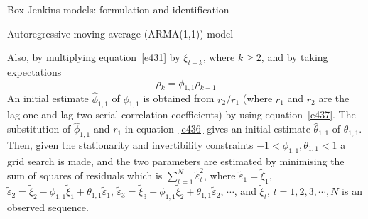 \documentclass[8pt]{beamer}
\renewcommand{\emph}[1]{\textcolor{myorange}{#1}}
\begin{document}
\begin{frame}{Box-Jenkins models: formulation and identification}
    \begin{block}{Autoregressive moving-average (ARMA(1,1)) model}
    \end{block}
    Also, by multiplying equation~\ref{e431} by $\xi_{t-k}$, where $k\geq 2$, and by taking expectations
    \begin{equation}
        \rho_{k} = \phi_{1,1} \rho_{k-1}
        \label{e437}
    \end{equation}
    An initial estimate $\hat{\phi}_{1,1}$ of $\phi_{1,1}$ is obtained from $r_2 / r_1$ (where $r_1$ and $r_2$ are the lag-one and lag-two serial correlation coefficients) by using equation~\ref{e437}. The substitution of $\hat{\phi}_{1,1}$ and $r_1$ in equation~\ref{e436} gives an initial estimate $\hat{\theta}_{1,1}$ of $\theta_{1,1}$. Then, given the \emph{stationarity} and \emph{invertibility} constraints $-1<\phi_{1,1}, \theta_{1,1}<1$ a \emph{grid search} is made, and the two parameters are estimated by minimising the sum of squares of residuals which is $\sum_{t=1}^N \tilde{\varepsilon}_t^2$, where $\tilde{\varepsilon}_1=\tilde{\xi}_1$, $\tilde{\varepsilon}_2=\tilde{\xi}_2 - \phi_{1,1}\tilde{\xi}_1 + \theta_{1,1} \tilde{\varepsilon}_1$, $\tilde{\varepsilon}_3=\tilde{\xi}_3 - \phi_{1,1}\tilde{\xi}_2 + \theta_{1,1} \tilde{\varepsilon}_2$, $\cdots$, and $\tilde{\xi}_t$, $t=1, 2, 3, \cdots, N$ is an observed sequence.

\end{frame}
\end{document}
